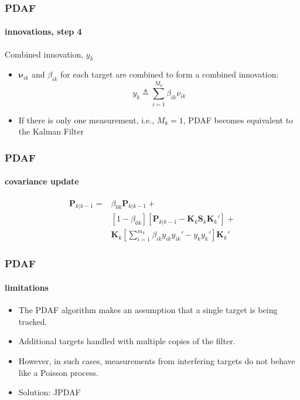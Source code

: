 \begin{frame}
\frametitle{PDAF}
\framesubtitle{innovations, step 4}
\logoCSIPCPL\mypagenum
	{\color{red} Combined innovation, $y_k$}
	\begin{itemize}
		\item $\mathbf{\nu}_{ik}$ and $\beta_{ik}$ for each target are combined to form a combined innovation:  
		\begin{equation*}
			y_k  \triangleq \sum_{i=1}^{M_k} \beta_{ik}\nu_{ik}
		\end{equation*}
	\item If there is only one measurement, i.e., $M_k=1$, PDAF becomes equivalent to the Kalman Filter
	\end{itemize}
\end{frame}




\begin{frame}
\frametitle{PDAF}
\framesubtitle{covariance update}
\logoCSIPCPL\mypagenum
	\begin{align*}
		\mathbf{P}_{k|k-1} =
		&\beta_{0k}\mathbf{P}_{k|k-1} +\\
		&\left[1-\beta_{0k}\right]\left[\mathbf{P}_{k|k-1}-\mathbf{K}_k\mathbf{S}_k\mathbf{K}_k'\right] +\\
		&\mathbf{K}_k\left[\sum\limits_{i=1}^{m_k}\beta_{ik}y_{ik}y_{ik}'-y_{k}y_{k}'\right]\mathbf{K}_k' 
	\end{align*}
\end{frame}




\begin{frame}
\frametitle{PDAF}
\framesubtitle{limitations}
\logoCSIPCPL\mypagenum
	\begin{itemize}
		\item The PDAF algorithm makes an assumption that a single target is being tracked.  
		\item Additional targets handled with multiple copies of the filter.  
		\item However, in such cases, measurements from interfering targets do not behave like a Poisson process.  
		\item Solution: JPDAF
	\end{itemize}
\end{frame}



